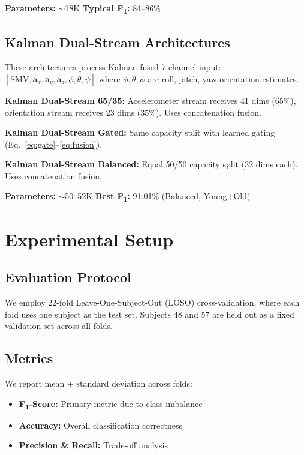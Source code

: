 \documentclass[journal,12pt]{IEEEtran}
\newcommand{\fone}{F\textsubscript{1}}
\newcommand{\acc}{\mathbf{a}}
\begin{document}
\textbf{Parameters:} $\sim$18K \quad \textbf{Typical \fone{}:} 84--86\%

\subsection{Kalman Dual-Stream Architectures}
\label{sec:kalman}

These architectures process Kalman-fused 7-channel input: $[\text{SMV}, \acc_x, \acc_y, \acc_z, \phi, \theta, \psi]$ where $\phi, \theta, \psi$ are roll, pitch, yaw orientation estimates.

\textbf{Kalman Dual-Stream 65/35:} Accelerometer stream receives 41 dims (65\%), orientation stream receives 23 dims (35\%). Uses concatenation fusion.

\textbf{Kalman Dual-Stream Gated:} Same capacity split with learned gating (Eq.~\ref{eq:gate}--\ref{eq:fusion}).

\textbf{Kalman Dual-Stream Balanced:} Equal 50/50 capacity split (32 dims each). Uses concatenation fusion.

\textbf{Parameters:} $\sim$50--52K \quad \textbf{Best \fone{}:} 91.01\% (Balanced, Young+Old)


\section{Experimental Setup}
\label{sec:setup}

\subsection{Evaluation Protocol}

We employ 22-fold Leave-One-Subject-Out (LOSO) cross-validation, where each fold uses one subject as the test set. Subjects 48 and 57 are held out as a fixed validation set across all folds.

\subsection{Metrics}

We report mean $\pm$ standard deviation across folds:
\begin{itemize}
    \item \textbf{\fone{}-Score:} Primary metric due to class imbalance
    \item \textbf{Accuracy:} Overall classification correctness
    \item \textbf{Precision \& Recall:} Trade-off analysis
\end{itemize}
\end{document}
